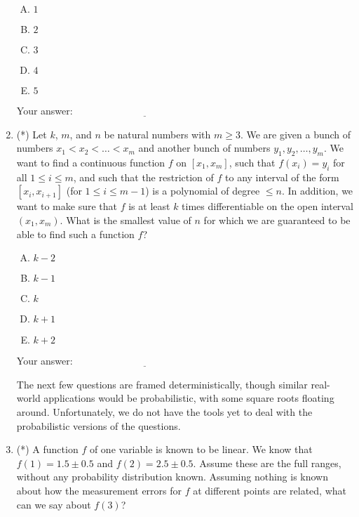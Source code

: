 \documentclass[10pt]{amsart}
\begin{document}
\begin{enumerate}
  \begin{enumerate}[(A)]
  \item $1$
  \item $2$
  \item $3$
  \item $4$
  \item $5$
  \end{enumerate}

  \vspace{0.1in}
  Your answer: $\underline{\qquad\qquad\qquad\qquad\qquad\qquad\qquad}$
  \vspace{0.1in}

\item (*) Let $k$, $m$, and $n$ be natural numbers with $m \ge 3$. We are
  given a bunch of numbers $x_1< x_2< \dots<x_m$ and another bunch of
  numbers $y_1,y_2,\dots,y_m$. We want to find a continuous function
  $f$ on $[x_1,x_m]$, such that $f(x_i) = y_i$ for all $1 \le i \le
  m$, and such that the restriction of $f$ to any interval of the form
  $[x_i,x_{i+1}]$ (for $1 \le i \le m - 1$) is a polynomial of degree
  $\le n$. In addition, we want to make sure that $f$ is at least $k$
  times differentiable on the open interval $(x_1,x_m)$. What is the
  smallest value of $n$ for which we are guaranteed to be able to find
  such a function $f$?

  \begin{enumerate}[(A)]
  \item $k - 2$
  \item $k - 1$
  \item $k$
  \item $k + 1$
  \item $k + 2$
  \end{enumerate}

  \vspace{0.1in}
  Your answer: $\underline{\qquad\qquad\qquad\qquad\qquad\qquad\qquad}$
  \vspace{0.1in}

  The next few questions are framed deterministically, though similar
  real-world applications would be probabilistic, with some square
  roots floating around. Unfortunately, we do not have the tools yet
  to deal with the probabilistic versions of the questions.

\item (*) A function $f$ of one variable is known to be linear. We know
  that $f(1) = 1.5 \pm 0.5$ and $f(2) = 2.5 \pm 0.5$. Assume these are
  the full ranges, without any probability distribution known. Assuming
  nothing is known about how the measurement errors for $f$ at
  different points are related, what can we say about $f(3)$?


\end{enumerate}
\end{document}
